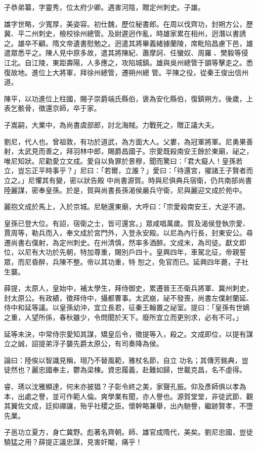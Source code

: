 \begin{pinyinscope}
 子恭弟纂，字靈秀，位太府少卿。遇害河陰，贈定州刺史。子雄。



 雄字世略，少寬厚，美姿容。初仕魏，歷位秘書郎。在周以伐齊功，封朔方公，歷冀、平二州刺史，檢校徐州總管。及尉遲迥作亂，時雄家累在相州，迥潛以書誘之。雄卒不顧。隋文帝遺書慰勉之。迥遣其將畢義緒據蘭陵，席毗陷昌慮下邑，雄遣眾悉平之。陳人見中原多故，遣其將陳紀、蕭摩訶、任蠻奴、周羅、樊毅等侵江北。自江陵，東距壽陽，人多應之，攻陷城鎮。雄與吳州總管于顗等擊走之。悉復故地。進位上大將軍，拜徐州總管，遷朔州總
 管。平陳之役，從秦王俊出信州道。



 陳平，以功進位上柱國，賜子崇爵端氏縣伯，褒為安化縣伯，復鎮朔方。後歲，上表乞骸骨，徵還京師，卒于家。



 子嵩嗣，大業中，為尚書虞部郎，討北海賊。力戰死之，贈正議大夫。



 劉尼，代人也。曾祖敦，有功於道武，為方面大人。父婁，為冠軍將軍。尼勇果善射，太武見而善之，拜羽林中郎，賜爵昌國子。宗愛既殺南安王餘於東廟，祕之，唯尼知狀。尼勸愛立文成。愛自以負罪於景穆，聞而驚曰：「君大癡人！皇孫若立，豈忘正平時事乎？」尼曰：「若爾，立誰？」愛曰：「待還宮，擢諸王子賢者而立之。」尼懼其有變，密以狀告殿
 中尚書源賀。時與尼俱典兵宿衛，仍共南部尚書陸麗謀，密奉皇孫。於是，賀與尚書長孫渴侯嚴兵守衛，尼與麗迎文成於苑中。



 麗抱文成於馬上，入於京城。尼馳還東廟，大呼曰：「宗愛殺南安王，大逆不道。



 皇孫已登大位。有詔，宿衛之士，皆可還宮。」眾咸唱萬歲。賀及渴侯登執宗愛、賈周等，勒兵而入，奉文成於宮門外，入登永安殿。以尼為內行長，封東安公。尋遷尚書右僕射，為定州刺史。在州清慎，然率多酒醉。文成末，為司徒。獻文即位，以尼有大功於先朝，特加尊重，賜別戶四十。皇興四年，車駕北征，帝親誓眾，而尼昏醉，兵陳不整。帝以其功重，特
 恕之，免官而已。延興四年薨，子社生襲。



 薛提，太原人，皇始中，補太學生，拜侍御史，累遷晉王丕衛兵將軍、冀州刺史，封太原公。有政績，徵拜侍中，攝都曹事。太武崩，祕不發喪，尚書左僕射蘭延、侍中和延等議。以皇孫幼沖，宜立長君，征秦王翰置之祕室。提曰：「皇孫有世嫡之重，人望所係，春秋雖少，令問聞於天下。廢所宜立而更別求，必有不可。」



 延等未決，中常侍宗愛知其謀，矯皇后令，徵提等入，殺之。文成即位，以提有謀立之誠，詔提弟浮子襲先爵太原公，有司奏降為侯。



 論曰：陸俟以智識見稱，珝乃不替風範，雅杖名節，自立
 功名；其傳芳銘典，豈徒然也？麗忠國奉主，鬱為梁棟。資忠履義，赴難如歸，世載克昌，名不虛得。



 睿、琇以沈雅顯達，何末亦披猖？子彰令終之美，家聲孔振。仰及彥師俱以孝為本，出處之譽，並可作範人倫。爽學業有聞，亦人譽也。源賀堂堂，非徒武節、觀其翼佐文成，廷抑禪讓，殆乎社稷之臣。懷幹略兼舉，出內馳譽，繼跡賢孝，不墮先業。



 子邕功立夏方，身亡冀野。彪著名齊朝。師、雄官成隋代，美矣。劉尼忠國，豈徒驍猛之用？薛提正議忠謀，見害奸閹，痛乎！



\end{pinyinscope}